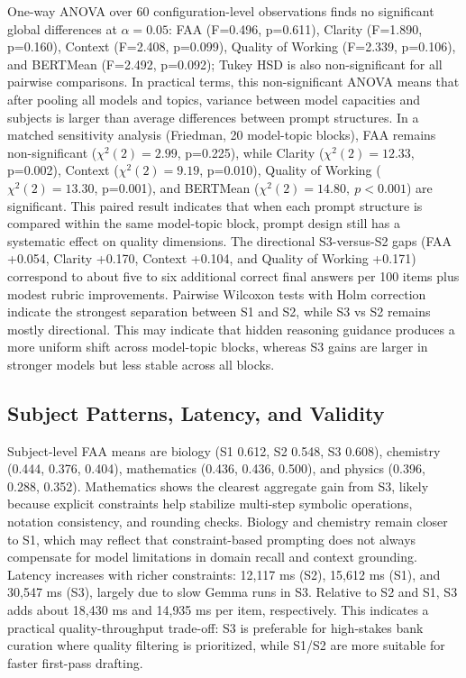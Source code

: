 ﻿\documentclass[a4paper,conference,10pt]{IEEEtran}
\begin{document}
One-way ANOVA over 60 configuration-level observations finds no significant global differences at \(\alpha=0.05\): FAA (F=0.496, p=0.611), Clarity (F=1.890, p=0.160), Context (F=2.408, p=0.099), Quality of Working (F=2.339, p=0.106), and BERTMean (F=2.492, p=0.092); Tukey HSD is also non-significant for all pairwise comparisons. In practical terms, this non-significant ANOVA means that after pooling all models and topics, variance between model capacities and subjects is larger than average differences between prompt structures. In a matched sensitivity analysis (Friedman, 20 model-topic blocks), FAA remains non-significant (\(\chi^2(2)=2.99\), p=0.225), while Clarity (\(\chi^2(2)=12.33\), p=0.002), Context (\(\chi^2(2)=9.19\), p=0.010), Quality of Working (\(\chi^2(2)=13.30\), p=0.001), and BERTMean ($\chi^2(2)=14.80,\ p<0.001$) are significant. This paired result indicates that when each prompt structure is compared within the same model-topic block, prompt design still has a systematic effect on quality dimensions. The directional S3-versus-S2 gaps (FAA +0.054, Clarity +0.170, Context +0.104, and Quality of Working +0.171) correspond to about five to six additional correct final answers per 100 items plus modest rubric improvements. Pairwise Wilcoxon tests with Holm correction indicate the strongest separation between S1 and S2, while S3 vs S2 remains mostly directional. This may indicate that hidden reasoning guidance produces a more uniform shift across model-topic blocks, whereas S3 gains are larger in stronger models but less stable across all blocks.

\subsection{Subject Patterns, Latency, and Validity}

Subject-level FAA means are biology (S1 0.612, S2 0.548, S3 0.608), chemistry (0.444, 0.376, 0.404), mathematics (0.436, 0.436, 0.500), and physics (0.396, 0.288, 0.352). Mathematics shows the clearest aggregate gain from S3, likely because explicit constraints help stabilize multi-step symbolic operations, notation consistency, and rounding checks. Biology and chemistry remain closer to S1, which may reflect that constraint-based prompting does not always compensate for model limitations in domain recall and context grounding. Latency increases with richer constraints: 12{,}117 ms (S2), 15{,}612 ms (S1), and 30{,}547 ms (S3), largely due to slow Gemma runs in S3. Relative to S2 and S1, S3 adds about 18{,}430 ms and 14{,}935 ms per item, respectively. This indicates a practical quality-throughput trade-off: S3 is preferable for high-stakes bank curation where quality filtering is prioritized, while S1/S2 are more suitable for faster first-pass drafting.
\end{document}
